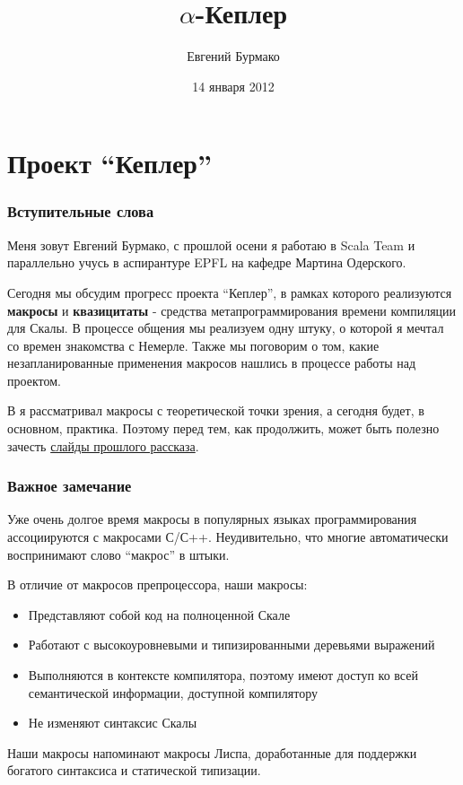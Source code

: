 \documentclass{beamer}
\title{$\alpha$-Кеплер}
\author{Евгений Бурмако}
\institute{EPFL, LAMP}
\date{14 января 2012}
\begin{document}
\section{Проект ``Кеплер''}

\maketitle

\begin{frame}[t]
\frametitle{Вступительные слова}

Меня зовут Евгений Бурмако, с прошлой осени я работаю в Scala Team и параллельно учусь в аспирантуре EPFL на кафедре Мартина Одерского.

Сегодня мы обсудим прогресс проекта ``Кеплер'', в рамках которого реализуются \textbf{макросы} и \textbf{квазицитаты} - средства метапрограммирования времени компиляции для Скалы. В процессе общения мы реализуем одну штуку, о которой я мечтал со времен знакомства с Немерле. Также мы поговорим о том, какие незапланированные применения макросов нашлись в процессе работы над проектом.

В  я рассматривал макросы с теоретической точки зрения, а сегодня будет, в основном, практика. Поэтому перед тем, как продолжить, может быть полезно зачесть {\color{linkblue}\href{http://scalamacros.org/talks/2011-10-29-RuProjectKepler.pdf}{слайды прошлого рассказа}}.
\end{frame}

\begin{frame}[t]
\frametitle{Важное замечание}

Уже очень долгое время макросы в популярных языках программирования ассоциируются с макросами С/С++. Неудивительно, что многие автоматически воспринимают слово ``макрос'' в штыки.

В отличие от макросов препроцессора, наши макросы:
\begin{itemize}
\item Представляют собой код на полноценной Скале
\item Работают с высокоуровневыми и типизированными деревьями выражений
\item Выполняются в контексте компилятора, поэтому имеют доступ ко всей семантической информации, доступной компилятору
\item Не изменяют синтаксис Скалы
\end{itemize}

Наши макросы напоминают макросы Лиспа, доработанные для поддержки богатого синтаксиса и статической типизации.
\end{frame}
\end{document}
